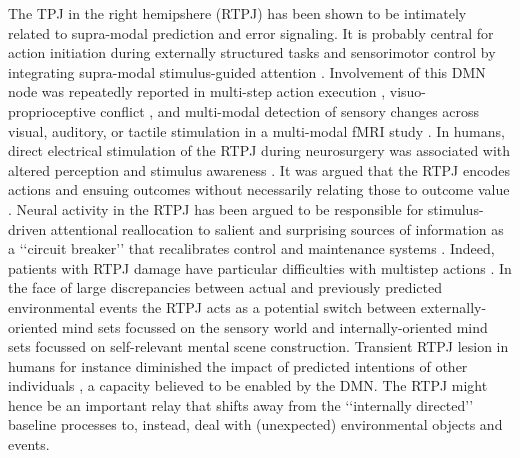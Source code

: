 \documentclass[10pt,letterpaper]{article}
\begin{document}
The TPJ in the right hemipshere (RTPJ)
has been shown to be intimately related to
supra-modal prediction and error signaling.
It is probably central for
action initiation during externally structured tasks and
sensorimotor control by integrating supra-modal stimulus-guided attention
\citep{corbetta2002control}.
Involvement of this DMN node was repeatedly reported in
multi-step action execution \citep{hartmann2005takes},
visuo-proprioceptive conflict \citep{Balslev2005}, and
multi-modal detection of sensory changes across
visual, auditory, or tactile stimulation in a multi-modal fMRI study
\citep{downar2000multimodal}.
In humans, direct electrical stimulation of the
RTPJ during neurosurgery was associated with altered perception
and stimulus awareness \citep{blanke2002neuropsychology}.
%
It was argued that the RTPJ encodes actions and ensuing outcomes
without necessarily relating those to outcome value
\citep{liljeholm2013neural, hamilton2008action,
jakobs2009effects}.
Neural activity in the RTPJ has been argued to be responsible
for stimulus-driven attentional reallocation to
salient and surprising sources of information
as a ‘‘circuit breaker’’ that recalibrates control and maintenance systems
\citep{bzdok2013tpj, corbettashul2008}.
Indeed, patients with RTPJ damage have particular difficulties
with multistep actions \citep{hartmann2005takes}.
In the face of large discrepancies between actual and previously predicted
environmental events the RTPJ acts as a potential switch between
externally-oriented mind sets focussed on the
sensory world and internally-oriented mind sets focussed
on self-relevant mental scene construction.
Transient RTPJ lesion in humans for instance diminished the
impact of predicted intentions of other individuals
\citep{young2010disruption},
a capacity believed to be enabled by the DMN.
The RTPJ might hence be an important relay that shifts away
from the ‘‘internally directed’’ baseline processes
to, instead, deal with (unexpected) environmental objects and events.
\end{document}
